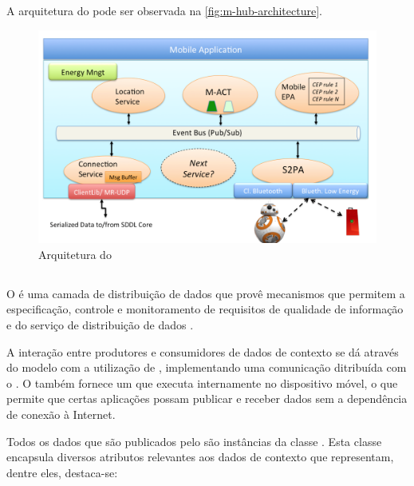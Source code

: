 A arquitetura do \middleware pode ser observada na \autoref{fig:m-hub-architecture}.

\begin{figure}[htb]
	\centering
	\caption{\label{fig:m-hub-architecture}Arquitetura do \mhub}
	\includegraphics[scale=0.34]{img/m-hub-architecture.png}
\end{figure}

\subsection{\cddl} \label{subsec:cddl}

O \cddl é uma camada de distribuição de dados que provê mecanismos que permitem a especificação, controle e monitoramento de requisitos de qualidade de informação e do serviço de distribuição de dados \cite{gomes:2017}.

A interação entre produtores e consumidores de dados de contexto se dá através do modelo \pubsub com a utilização de \brokers, implementando uma comunicação ditribuída com o \mqtt. O \cddl também fornece um \ubroker que executa internamente no dispositivo móvel, o que permite que certas aplicações possam publicar e receber dados sem a dependência de conexão à Internet.

Todos os dados que são publicados pelo \cddl são instâncias da classe \msg.
Esta classe encapsula diversos atributos relevantes aos dados de contexto que representam, dentre eles, destaca-se:

